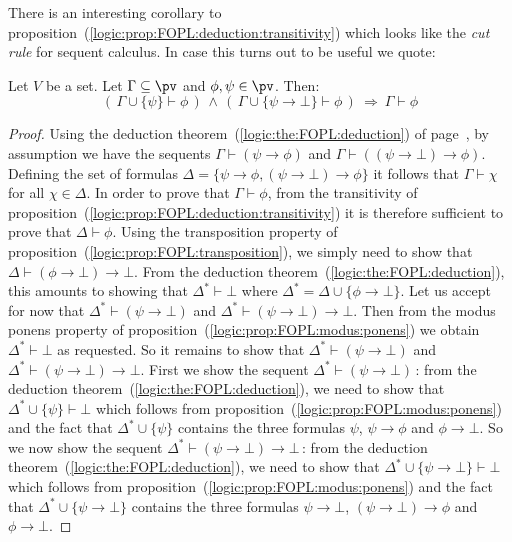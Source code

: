 There is an interesting corollary to
proposition~(\ref{logic:prop:FOPL:deduction:transitivity}) which
looks like the {\em cut rule} for sequent calculus. In case this
turns out to be useful we quote:

\begin{prop}\label{logic:prop:FUAP:transitivity:cut:elimination}
Let $V$ be a set. Let $\Gamma\subseteq\pv$ and $\phi,\psi\in\pv$.
Then:
    \[
    (\,\Gamma\cup\{\psi\}\vdash\phi\,)\,\land\,(\,\Gamma\cup\{\psi\to\bot\}\vdash\phi\,)\
    \Rightarrow\ \Gamma\vdash\phi
    \]
\end{prop}
\begin{proof}
Using the deduction theorem~(\ref{logic:the:FOPL:deduction}) of
page~\pageref{logic:the:FOPL:deduction}, by assumption we have the
sequents $\Gamma\vdash(\psi\to\phi)$ and
$\Gamma\vdash((\psi\to\bot)\to\phi)$. Defining the set of formulas
$\Delta=\{\psi\to\phi,(\psi\to\bot)\to\phi\}$ it follows that
$\Gamma\vdash\chi$ for all $\chi\in\Delta$. In order to prove that
$\Gamma\vdash\phi$, from the transitivity of
proposition~(\ref{logic:prop:FOPL:deduction:transitivity}) it is
therefore sufficient to prove that $\Delta\vdash\phi$. Using the
transposition property of
proposition~(\ref{logic:prop:FOPL:transposition}), we simply need to
show that $\Delta\vdash(\phi\to\bot)\to\bot$. From the deduction
theorem~(\ref{logic:the:FOPL:deduction}), this amounts to showing
that $\Delta^{*}\vdash\bot$ where
$\Delta^{*}=\Delta\cup\{\phi\to\bot\}$. Let us accept for now that
$\Delta^{*}\vdash(\psi\to\bot)$ and
$\Delta^{*}\vdash(\psi\to\bot)\to\bot$. Then from the modus ponens
property of proposition~(\ref{logic:prop:FOPL:modus:ponens}) we
obtain $\Delta^{*}\vdash\bot$ as requested. So it remains to show
that $\Delta^{*}\vdash(\psi\to\bot)$ and
$\Delta^{*}\vdash(\psi\to\bot)\to\bot$. First we show the sequent
$\Delta^{*}\vdash(\psi\to\bot)$\,: from the deduction
theorem~(\ref{logic:the:FOPL:deduction}), we need to show that
$\Delta^{*}\cup\{\psi\}\vdash\bot$ which follows from
proposition~(\ref{logic:prop:FOPL:modus:ponens}) and the fact that
$\Delta^{*}\cup\{\psi\}$ contains the three formulas $\psi$,
$\psi\to\phi$ and $\phi\to\bot$. So we now show the sequent
$\Delta^{*}\vdash(\psi\to\bot)\to\bot$\,: from the deduction
theorem~(\ref{logic:the:FOPL:deduction}), we need to show that
$\Delta^{*}\cup\{\psi\to\bot\}\vdash\bot$ which follows from
proposition~(\ref{logic:prop:FOPL:modus:ponens}) and the fact that
$\Delta^{*}\cup\{\psi\to\bot\}$ contains the three formulas
$\psi\to\bot$, $(\psi\to\bot)\to\phi$ and $\phi\to\bot$.
\end{proof}
